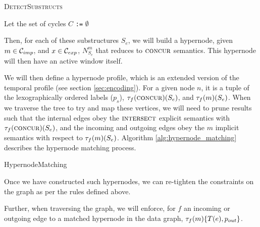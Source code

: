 \begin{algorithm}
  \label{alg:detect_substructs}
  \caption{\textsc{DetectSubstructs}}
  \SetAlgoLined

  Let the set of cycles $C$ \texttt{:=} $\emptyset$\;
\end{algorithm}

Then, for each of these substructures $S_e$, we will build a hypernode, given $m
\in \mathcal{C}_{imp}$, and $x \in \mathcal{C}_{exp}$, $N_{S_e}^{m}$ that reduces to $\textsc{concur}$
semantics. This hypernode will then have an active window itself.

We will then define a hypernode profile, which is an extended version of the
temporal profile (see section \ref{sec:encoding}). For a given node $n$, it is a
tuple of the lexographically ordered labels ($p_s$),
$\tau_f(\textsc{concur})(S_e)$, and $\tau_f(m)(S_e)$. When we traverse the
tree to try and map these vertices, we will need to prune results such that the
internal edges obey the $\textsc{intersect}$ explicit semantics with
$\tau_f(\textsc{concur})(S_e)$, and the incoming and outgoing edges obey the $m$
implicit semantics with respect to $\tau_f(m)(S_e)$. Algorithm
\ref{alg:hypernode_matching} describes the hypernode matching process.

\begin{algorithm}
  \label{alg:hypernode_matching}
  \caption{HypernodeMatching}


  \SetAlgoLined
  

\end{algorithm}

Once we have constructed such hypernodes, we can re-tighten the constraints on
the graph as per the rules defined above.

Further, when traversing the graph, we will enforce, for $f$ an incoming or
outgoing edge to a matched hypernode in the data graph, $\tau_f(m)\{T(e),
p_{out}\}$.
